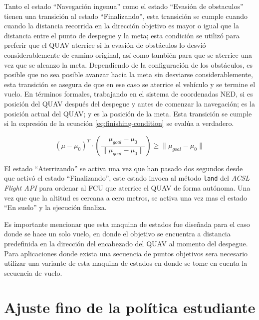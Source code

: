 Tanto el estado ``Navegación ingenua'' como el estado ``Evasión de obstaculos'' tienen una transición al estado ``Finalizando'', esta transición se cumple cuando cuando la distancia recorrida en la dirección objetivo es mayor o igual que la distancia entre el punto de despegue y la meta; esta condición se utilizó para preferir que el QUAV aterrice si la evasión de obstáculos lo desvió considerablemente de camino original, así como también para que se aterrice una vez que se alcanzo la meta. Dependiendo de la configuración de los obstáculos, es posible que no sea posible avanzar hacia la meta sin desviarse considerablemente, esta transición se asegura de que en ese caso se aterrice el vehículo y se termine el vuelo. En términos formales, trabajando en el sistema de coordenadas NED, si  es posición del QUAV después del despegue y antes de comenzar la navegación; \jim{\mu} es la posición actual del QUAV; y  es la posición de la meta. Esta transición se cumple si la expresión de la ecuación \ref{eq:finishing-condition} se evalúa a verdadero.

\begin{equation}
    \label{eq:finishing-condition}
    (\mu - \mu_0)^T \cdot \left (\frac{\mu_{goal} - \mu_0}{\|\mu_{goal} - \mu_0\|}  \right) \geq \|\mu_{goal} - \mu_0\|
\end{equation}

El estado ``Aterrizando'' se activa una vez que han pasado dos segundos desde que activó el estado ``Finalizando'', este estado invoca al método \texttt{land} del \textit{ACSL Flight API} para ordenar al FCU que aterrice el QUAV de forma autónoma. Una vez que que la altitud es cercana a cero metros, se activa una vez mas el estado ``En suelo'' y la ejecución finaliza.

Es importante mencionar que esta maquina de estados fue diseñada para el caso donde se hace un solo vuelo, en donde el objetivo se encuentra a distancia predefinida en la dirección del encabezado del QUAV al momento del despegue. Para aplicaciones donde exista una secuencia de puntos objetivos sera necesario utilizar una variante de esta maquina de estados en donde se tome en cuenta la secuencia de vuelo. 

\section{Ajuste fino de la política estudiante}

\label{sec:imp-finetune}

